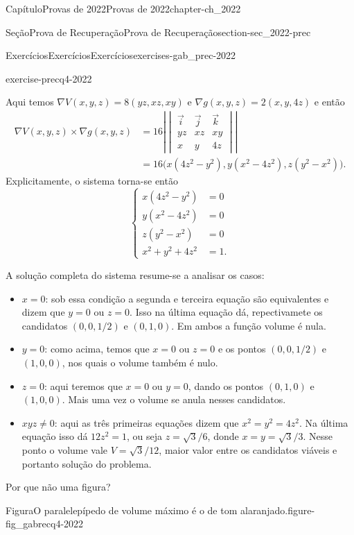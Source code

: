 \documentclass[oneside,10pt,]{book}
\numberwithin{equation}{section}
\newcommand{\amp}{&}
\begin{document}
\begin{chapterptx}{Capítulo}{Provas de 2022}{}{Provas de 2022}{}{}{chapter-ch_2022}
\begin{sectionptx}{Seção}{Prova de Recuperação}{}{Prova de Recuperação}{}{}{section-sec_2022-prec}
\begin{exercises-subsection-numberless}{Exercícios}{Exercícios}{}{Exercícios}{}{}{exercises-gab_prec-2022}
\begin{divisionexercise}{4}{}{}{exercise-precq4-2022}
\begin{equation*}
\end{equation*}
%
\par
Aqui temos \(\nabla V(x,y,z)=8(yz,xz,xy)\) e \(\nabla
g(x,y,z)=2(x,y,4z)\) e então%
\begin{align*}
\nabla V(x,y,z)\times\nabla g(x,y,z)\amp =16 \left|\begin{vmatrix}
\vec{i}\amp\vec{j}\amp\vec{k}\\ yz\amp xz\amp xy\\ x\amp y\amp
4z\end{vmatrix}\right|\\
\amp
=16\big(x(4z^2-y^2),y(x^2-4z^2),z(y^2-x^2)\big).
\end{align*}
Explicitamente, o sistema torna-se então%
\begin{equation*}
\begin{cases}
x(4z^2-y^2)\amp =0\\ y(x^2-4z^2)\amp =0\\ z(y^2-x^2)\amp =0\\
x^2+y^2+4z^2\amp =1.  \end{cases}
\end{equation*}
%
\par
A solução completa do sistema resume-se a analisar os casos:%
\begin{itemize}[label=\textbullet]
\item{}\(x=0\): sob essa condição a segunda e terceira equação são equivalentes e dizem que \(y=0\) ou \(z=0\). Isso na última equação dá, repectivamete os candidatos \(\boxed{(0,0,1/2)}\) e \(\boxed{(0,1,0)}\). Em ambos a função volume é nula.%
\item{}\(y=0\): como acima, temos que \(x=0\) ou \(z=0\) e os pontos \(\boxed{(0,0,1/2)}\) e \(\boxed{(1,0,0)}\), nos quais o volume também é nulo.%
\item{}\(z=0\): aqui teremos que \(x=0\) ou \(y=0\), dando os pontos \(\boxed{(0,1,0)}\) e \(\boxed{(1,0,0)}\). Mais uma vez o volume se anula nesses candidatos.%
\item{}\(xyz\neq 0\): aqui as três primeiras equações dizem que \(x^2=y^2=4z^2\). Na última equação isso dá \(12z^2=1\), ou seja \(z=\sqrt{3}/6\), donde \(x=y=\sqrt{3}/3\). Nesse ponto o volume vale \(V=\sqrt{3}/12\), maior valor entre os candidatos viáveis e portanto solução do problema.%
\end{itemize}
%
\par
Por que não uma figura?%
\begin{figureptx}{Figura}{O paralelepípedo de volume máximo é o de tom alaranjado.}{figure-fig_gabrecq4-2022}{}%

\end{figureptx}
\end{divisionexercise}
\end{exercises-subsection-numberless}
\end{sectionptx}
\end{chapterptx}
\end{document}
